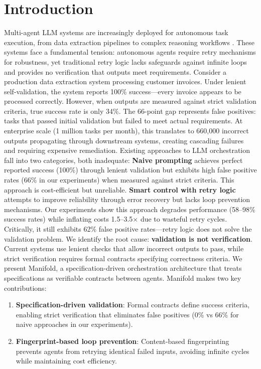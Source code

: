 \documentclass{article}
\begin{document}
\section{Introduction}
Multi-agent LLM systems are increasingly deployed for autonomous task execution, from data extraction pipelines to complex reasoning workflows \citep{openai2023gpt4,anthropic2024claude,xi2023rise}. These systems face a fundamental tension: autonomous agents require retry mechanisms for robustness, yet traditional retry logic lacks safeguards against infinite loops and provides no verification that outputs meet requirements.
Consider a production data extraction system processing customer invoices. Under lenient self-validation, the system reports 100\% success---every invoice appears to be processed correctly. However, when outputs are measured against strict validation criteria, true success rate is only 34\%. The 66-point gap represents false positives: tasks that passed initial validation but failed to meet actual requirements. At enterprise scale (1 million tasks per month), this translates to 660,000 incorrect outputs propagating through downstream systems, creating cascading failures and requiring expensive remediation.
Existing approaches to LLM orchestration fall into two categories, both inadequate:
\textbf{Naive prompting} achieves perfect reported success (100\%) through lenient validation but exhibits high false positive rates (66\% in our experiments) when measured against strict criteria. This approach is cost-efficient but unreliable.
\textbf{Smart control with retry logic} attempts to improve reliability through error recovery but lacks loop prevention mechanisms. Our experiments show this approach degrades performance (58--98\% success rates) while inflating costs 1.5--3.5$\times$ due to wasteful retry cycles. Critically, it still exhibits 62\% false positive rates---retry logic does not solve the validation problem.
We identify the root cause: \textbf{validation is not verification}. Current systems use lenient checks that allow incorrect outputs to pass, while strict verification requires formal contracts specifying correctness criteria.
We present Manifold, a specification-driven orchestration architecture that treats specifications as verifiable contracts between agents. Manifold makes two key contributions:
\begin{enumerate}
\item \textbf{Specification-driven validation}: Formal contracts define success criteria, enabling strict verification that eliminates false positives (0\% vs 66\% for naive approaches in our experiments).
\item \textbf{Fingerprint-based loop prevention}: Content-based fingerprinting prevents agents from retrying identical failed inputs, avoiding infinite cycles while maintaining cost efficiency.
\end{enumerate}
\end{document}
